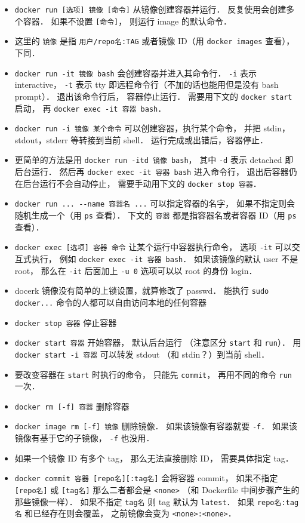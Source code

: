 \begin{itemize}
\item \verb|docker run [选项] 镜像 [命令]| 从镜像创建容器并运行． 反复使用会创建多个容器． 如果不设置 \verb|[命令]|， 则运行 image 的默认命令．
\item 这里的 \verb|镜像| 是指 \verb|用户/repo名:TAG| 或者镜像 ID（用 \verb|docker images| 查看）， 下同．
\item \verb|docker run -it 镜像 bash| 会创建容器并进入其命令行． \verb|-i| 表示 interactive， \verb|-t| 表示 tty 即远程命令行（不加的话也能用但是没有 bash prompt）． 退出该命令行后， 容器停止运行． 需要用下文的 \verb|docker start| 启动， 再 \verb|docker exec -it 容器 bash|．
\item \verb|docker run -i 镜像 某个命令| 可以创建容器，执行某个命令， 并把 stdin，stdout，stderr 等转接到当前 shell． 运行完成或出错后，容器停止．
\item 更简单的方法是用 \verb|docker run -itd 镜像 bash|， 其中 \verb|-d| 表示 detached 即后台运行． 然后再 \verb|docker exec -it 容器 bash| 进入命令行， 退出后容器仍在后台运行不会自动停止， 需要手动用下文的 \verb|docker stop 容器|．
\item \verb|docker run ... --name 容器名 ...| 可以指定容器的名字， 如果不指定则会随机生成一个（用 \verb|ps| 查看）． 下文的 \verb|容器| 都是指容器名或者容器 ID（用 \verb|ps| 查看）．
\item \verb`docker exec [选项] 容器 命令` 让某个运行中容器执行命令， 选项 \verb|-it| 可以交互式执行， 例如 \verb|docker exec -it 容器 bash|． 如果该镜像的默认 user 不是 root， 那么在 \verb|-it| 后面加上 \verb|-u 0| 选项可以以 root 的身份 login．
\item docerk 镜像没有简单的上锁设置，就算修改了 passwd． 能执行 \verb`sudo docker...` 命令的人都可以自由访问本地的任何容器
\item \verb`docker stop 容器` 停止容器
\item \verb`docker start 容器` 开始容器， 默认后台运行 （注意区分 \verb|start| 和 \verb|run|）． 用 \verb|docker start -i 容器| 可以转发 stdout （和 stdin？）到当前 shell．
\item 要改变容器在 \verb|start| 时执行的命令， 只能先 \verb|commit|， 再用不同的命令 \verb|run| 一次．
\item \verb`docker rm [-f] 容器` 删除容器
\item \verb`docker image rm [-f] 镜像` 删除镜像． 如果该镜像有容器就要 \verb|-f|． 如果该镜像有基于它的子镜像， \verb|-f| 也没用．
\item 如果一个镜像 ID 有多个 tag， 那么无法直接删除 ID， 需要具体指定 tag．
\item \verb`docker commit 容器 [repo名][:tag名]` 会将容器 commit， 如果不指定 \verb|[repo名]| 或 \verb|[tag名]| 那么二者都会是 \verb|<none>| （和 Dockerfile 中间步骤产生的那些镜像一样）． 如果不指定 \verb|tag名| 则 tag 默认为 \verb|latest|． 如果 \verb|repo名:tag名| 和已经存在则会覆盖， 之前镜像会变为 \verb|<none>:<none>|．

\end{itemize}
